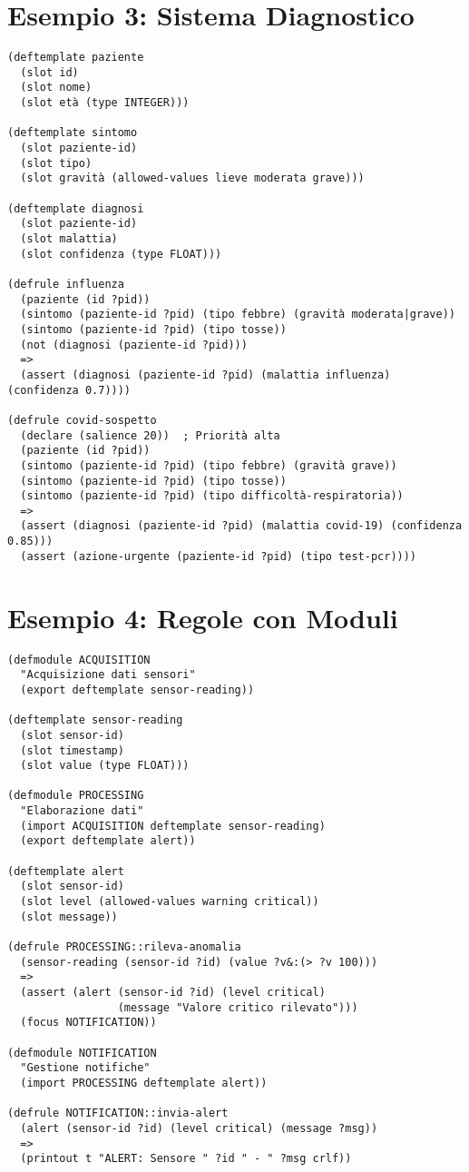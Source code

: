 \section{Esempio 3: Sistema Diagnostico}

\begin{lstlisting}[language=CLIPS]
(deftemplate paziente
  (slot id)
  (slot nome)
  (slot età (type INTEGER)))

(deftemplate sintomo
  (slot paziente-id)
  (slot tipo)
  (slot gravità (allowed-values lieve moderata grave)))

(deftemplate diagnosi
  (slot paziente-id)
  (slot malattia)
  (slot confidenza (type FLOAT)))

(defrule influenza
  (paziente (id ?pid))
  (sintomo (paziente-id ?pid) (tipo febbre) (gravità moderata|grave))
  (sintomo (paziente-id ?pid) (tipo tosse))
  (not (diagnosi (paziente-id ?pid)))
  =>
  (assert (diagnosi (paziente-id ?pid) (malattia influenza) (confidenza 0.7))))

(defrule covid-sospetto
  (declare (salience 20))  ; Priorità alta
  (paziente (id ?pid))
  (sintomo (paziente-id ?pid) (tipo febbre) (gravità grave))
  (sintomo (paziente-id ?pid) (tipo tosse))
  (sintomo (paziente-id ?pid) (tipo difficoltà-respiratoria))
  =>
  (assert (diagnosi (paziente-id ?pid) (malattia covid-19) (confidenza 0.85)))
  (assert (azione-urgente (paziente-id ?pid) (tipo test-pcr))))
\end{lstlisting}

\section{Esempio 4: Regole con Moduli}

\begin{lstlisting}[language=CLIPS]
(defmodule ACQUISITION
  "Acquisizione dati sensori"
  (export deftemplate sensor-reading))

(deftemplate sensor-reading
  (slot sensor-id)
  (slot timestamp)
  (slot value (type FLOAT)))

(defmodule PROCESSING
  "Elaborazione dati"
  (import ACQUISITION deftemplate sensor-reading)
  (export deftemplate alert))

(deftemplate alert
  (slot sensor-id)
  (slot level (allowed-values warning critical))
  (slot message))

(defrule PROCESSING::rileva-anomalia
  (sensor-reading (sensor-id ?id) (value ?v&:(> ?v 100)))
  =>
  (assert (alert (sensor-id ?id) (level critical) 
                 (message "Valore critico rilevato")))
  (focus NOTIFICATION))

(defmodule NOTIFICATION
  "Gestione notifiche"
  (import PROCESSING deftemplate alert))

(defrule NOTIFICATION::invia-alert
  (alert (sensor-id ?id) (level critical) (message ?msg))
  =>
  (printout t "ALERT: Sensore " ?id " - " ?msg crlf))
\end{lstlisting}

